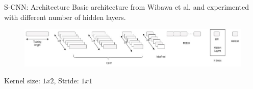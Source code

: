 \documentclass[aspectratio=169, 12pt]{beamer}
\begin{document}
\begin{frame}{S-CNN: Architecture}
Basic architecture from Wibawa et al.\cite{e-cnn} and experimented with different number of hidden layers.
\begin{figure}[htbp]
\centering
\includegraphics[width=\columnwidth]{./plots/s-cnn.jpg}
\end{figure}
\begin{center}
    Kernel size: $1x2$, Stride: $1x1$
\end{center}
\end{frame}
\end{document}
